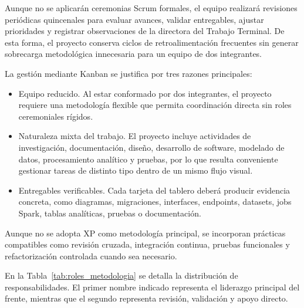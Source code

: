 Aunque no se aplicarán ceremonias Scrum formales, el equipo realizará revisiones
periódicas quincenales para evaluar avances, validar entregables, ajustar prioridades
y registrar observaciones de la directora del Trabajo Terminal. De esta forma, el
proyecto conserva ciclos de retroalimentación frecuentes sin generar sobrecarga
metodológica innecesaria para un equipo de dos integrantes.

La gestión mediante Kanban se justifica por tres razones principales:

\begin{itemize}[leftmargin=1.5em]
  \item Equipo reducido. Al estar conformado por dos integrantes, el proyecto
  requiere una metodología flexible que permita coordinación directa sin roles
  ceremoniales rígidos.

  \item Naturaleza mixta del trabajo. El proyecto incluye actividades de
  investigación, documentación, diseño, desarrollo de software, modelado de datos,
  procesamiento analítico y pruebas, por lo que resulta conveniente gestionar tareas
  de distinto tipo dentro de un mismo flujo visual.

  \item Entregables verificables. Cada tarjeta del tablero deberá producir
evidencia concreta, como diagramas, migraciones, interfaces, endpoints, datasets,
  jobs Spark, tablas analíticas, pruebas o documentación.
\end{itemize}

Aunque no se adopta XP como metodología principal, se incorporan prácticas compatibles
como revisión cruzada, integración continua, pruebas funcionales y refactorización
controlada cuando sea necesario.

En la Tabla~\ref{tab:roles_metodologia} se detalla la distribución de responsabilidades.
El primer nombre indicado representa el liderazgo principal del frente, mientras que
el segundo representa revisión, validación y apoyo directo.

